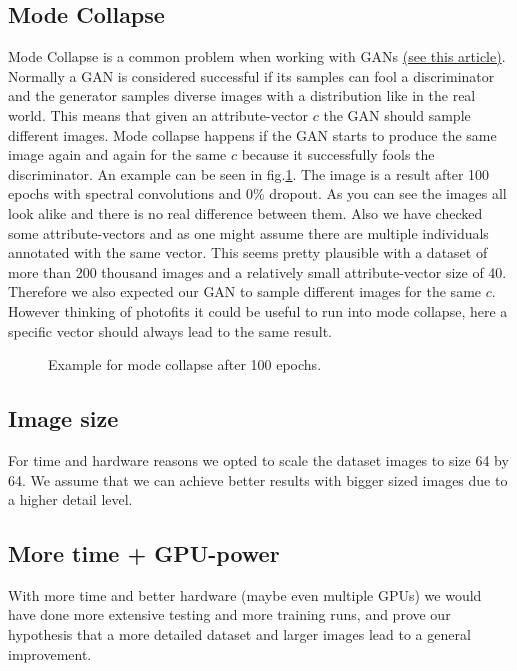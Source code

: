 \documentclass[12pt, a4paper]{article}
\begin{document}
\subsection{Mode Collapse}
Mode Collapse is a common problem when working with GANs \href{https://machinelearning.wtf/terms/mode-collapse/}{(see this article)}. 
Normally a GAN is considered successful if its samples can fool a discriminator and the generator samples diverse images with a distribution like in the real world. 
This means that given an attribute-vector $c$ the GAN should sample different images. Mode collapse happens if the GAN starts to produce the same image again and again for the same $c$
because it successfully fools the discriminator. An example can be seen in fig.\ref{fig:modecollapse}.
The image is a result after 100 epochs with spectral convolutions and 0\% dropout. As you can see the images all look alike and there is no real difference between them. Also we have checked some attribute-vectors 
and as one might assume there are multiple individuals annotated with the same vector. This seems pretty plausible with a dataset of more than 200 thousand images and a relatively small attribute-vector size of 40. Therefore 
we also expected our GAN to sample different images for the same $c$. However thinking of photofits it could be useful to run into mode collapse, here a specific vector should always lead to the same result.
\begin{figure}
    \caption{Example for mode collapse after 100 epochs.}
    \label{fig:modecollapse}
\end{figure}
\subsection{Image size}
For time and hardware reasons we opted to scale the dataset images to size 64 by 64. We assume that we can achieve better results with bigger sized images due to a higher detail level.

\subsection{More time + GPU-power}
With more time and better hardware (maybe even multiple GPUs) we would have done more extensive testing and more training runs, and prove our hypothesis that a more detailed dataset and larger images lead to a general improvement.
\end{document}
